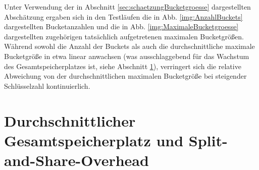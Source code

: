 \documentclass[a4paper,12pt,twoside]{report}
\begin{document}
Unter Verwendung der in Abschnitt \ref{sec:schaetzungBucketgroesse} dargestellten Abschätzung ergaben sich in den Testläufen die in Abb. \ref{img:AnzahlBuckets} dargestellten Bucketanzahlen und die in Abb. \ref{img:MaximaleBucketgroesse} dargestellten zugehörigen tatsächlich aufgetretenen maximalen Bucketgrößen.
Während sowohl die Anzahl der Buckets als auch die durchschnittliche maximale Bucketgröße in etwa linear anwachsen (was ausschlaggebend für das Wachstum des Gesamtspeicherplatzes ist, siehe Abschnitt \ref{sec:speicherplatzOverhead}), verringert sich die relative Abweichung von der durchschnittlichen maximalen Bucketgröße bei steigender Schlüsselzahl kontinuierlich.
\pagebreak
\section{Durchschnittlicher Gesamtspeicherplatz und Split-and-Share-Overhead}
\label{sec:speicherplatzOverhead}
\end{document}
